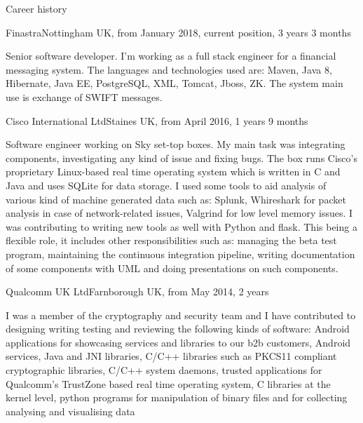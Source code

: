 \documentclass{resume}
\begin{document}
  \begin{rSection}{Career history}
     
    \begin{rSubsection}{Finastra}{Nottingham UK, from January 2018, current position, 3 years 3 months}{}{}
   \item[]
      Senior software developer. I'm working as a full stack engineer for a financial messaging system. The languages and technologies used are: Maven, Java 8, Hibernate, Java EE, PostgreSQL, XML, Tomcat, Jboss, ZK. The system main use is exchange of SWIFT messages.
    \end{rSubsection}

   
    \begin{rSubsection}{Cisco International Ltd}{Staines UK, from April 2016, 1 years 9 months}{}{}
    \item[]
      Software engineer working on Sky set-top boxes.
      My main task was integrating components, investigating any kind of issue and fixing bugs. 
      The box runs Cisco's proprietary Linux-based real time operating system which is written in C and Java and uses SQLite for data storage.
      I used some tools to aid analysis of various kind of machine generated data such as: Splunk, Whireshark for packet analysis in case of network-related issues, Valgrind for low level memory issues.
      I was contributing to writing new tools as well with Python and flask.
      This being a flexible role, it includes other responsibilities such as: managing the beta test program, maintaining the continuous integration pipeline, writing documentation of some components with UML and doing presentations on such components.
    \end{rSubsection}

    \begin{rSubsection}{Qualcomm UK Ltd}{Farnborough UK, from May 2014, 2 years}{}{}
	\item[]
	  I was a member of the cryptography and security team and I have contributed to designing writing testing and reviewing the following kinds of software:
	  Android applications for showcasing services and libraries to our b2b customers,
	  Android services, 
	  Java and JNI libraries, 
	  C/C++ libraries such as PKCS11 compliant cryptographic libraries,
	  C/C++ system daemons,
	  trusted applications for Qualcomm's TrustZone based real time operating system,
	  C libraries at the kernel level,
	  python programs for manipulation of binary files and for collecting analysing and visualising data


\end{rSubsection}
\end{rSection}
\end{document}
